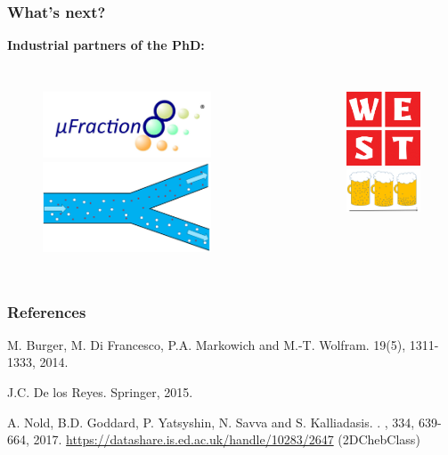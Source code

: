 \documentclass[aspectratio=169,xcolor=dvipsnames]{beamer}
\begin{document}
\begin{frame}
	\frametitle{What's next?}
	\textbf{Industrial partners of the PhD:}
	\begin{columns}
		\begin{figure}
			\includegraphics[width=5cm]{ufraction8.png}
			\includegraphics[width=5cm]{Microfilter.png}
		\end{figure}
		
		\begin{figure}
			\includegraphics[width=3cm]{west.png}\\
			\includegraphics[width=3.5cm]{beer.png}
		\end{figure}
	\end{columns}
\end{frame}
\begin{frame}
\frametitle{References}    
\begin{thebibliography}{10}    

	M. Burger, M. Di Francesco, P.A. Markowich and  M.-T. Wolfram. 
		 19(5), 1311-1333, 2014. 
	
	J.C. De los Reyes.
	\newblock 	Springer, 2015.
	
	A. Nold, B.D. Goddard, P. Yatsyshin, N. Savva and S. Kalliadasis. 
	.
	, 334, 639-664, 2017.
	\newblock \url{https://datashare.is.ed.ac.uk/handle/10283/2647} (2DChebClass)
\end{thebibliography}
\end{frame}
\end{document}
